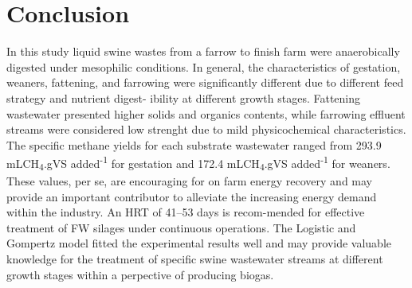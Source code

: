 \section{Conclusion}
In this study liquid swine wastes from a farrow to finish farm were anaerobically digested under mesophilic conditions. In general, the characteristics of gestation, weaners, fattening, and farrowing were significantly different due to different feed strategy and nutrient digest- ibility at different growth stages. Fattening wastewater presented higher solids and organics contents, while farrowing effluent streams were considered low strenght due to mild physicochemical characteristics. The specific methane yields for each substrate wastewater ranged from 293.9 mLCH\textsubscript{4}.gVS added\textsuperscript{-1} for gestation and 172.4 mLCH\textsubscript{4}.gVS added\textsuperscript{-1} for weaners. These values, per se, are encouraging for on farm energy recovery and may provide an important contributor to alleviate the increasing energy demand within the industry.  An HRT of 41–53 days is recom-mended for effective treatment of FW silages under continuous operations. The Logistic and Gompertz model fitted the experimental results well and may provide valuable knowledge for the treatment of specific swine wastewater streams at different growth stages within a perpective of producing biogas.